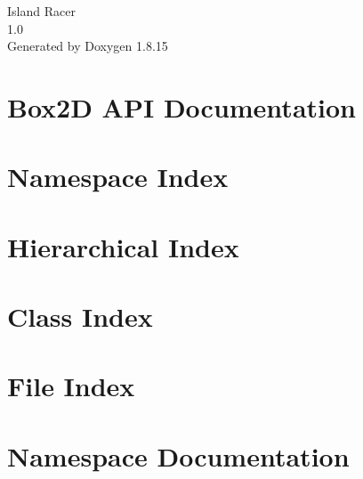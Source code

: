 \let\mypdfximage\pdfximage\def\pdfximage{\immediate\mypdfximage}\documentclass[twoside]{book}
\newcommand{\+}{\discretionary{\mbox{\scriptsize$\hookleftarrow$}}{}{}}
\newcommand{\clearemptydoublepage}{%
  \newpage{\pagestyle{empty}\cleardoublepage}%
}
\begin{document}
\hypersetup{pageanchor=false,
             bookmarksnumbered=true,
             pdfencoding=unicode
            }
\begin{titlepage}
\vspace*{7cm}
\begin{center}%
{\Large Island Racer \\[1ex]\large 1.\+0 }\\
\vspace*{1cm}
{\large Generated by Doxygen 1.8.15}\\
\end{center}
\end{titlepage}
\clearemptydoublepage
{}
\tableofcontents
\clearemptydoublepage
{}
\hypersetup{pageanchor=true}

\chapter{Box2D A\+PI Documentation}
\label{index}\hypertarget{index}{}
\chapter{Namespace Index}

\chapter{Hierarchical Index}

\chapter{Class Index}

\chapter{File Index}

\chapter{Namespace Documentation}

\end{document}
